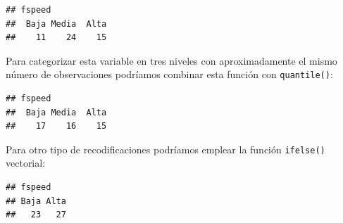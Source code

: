 \documentclass[
]{book}
\newenvironment{Shaded}{\begin{snugshade}}{\end{snugshade}}
\newcommand{\AttributeTok}[1]{\textcolor[rgb]{0.13,0.29,0.53}{#1}}
\newcommand{\DecValTok}[1]{\textcolor[rgb]{0.00,0.00,0.81}{#1}}
\newcommand{\FunctionTok}[1]{\textcolor[rgb]{0.13,0.29,0.53}{\textbf{#1}}}
\newcommand{\NormalTok}[1]{#1}
\newcommand{\OtherTok}[1]{\textcolor[rgb]{0.56,0.35,0.01}{#1}}
\newcommand{\SpecialCharTok}[1]{\textcolor[rgb]{0.81,0.36,0.00}{\textbf{#1}}}
\newcommand{\StringTok}[1]{\textcolor[rgb]{0.31,0.60,0.02}{#1}}
\theoremstyle{break}
\theoremstyle{nonumberplain}
\begin{document}
\begin{verbatim}
## fspeed
##  Baja Media  Alta 
##    11    24    15
\end{verbatim}

Para categorizar esta variable en tres niveles con aproximadamente el mismo número de observaciones podríamos combinar esta función con \texttt{quantile()}:

\begin{Shaded}
\end{Shaded}

\begin{verbatim}
## fspeed
##  Baja Media  Alta 
##    17    16    15
\end{verbatim}

Para otro tipo de recodificaciones podríamos emplear la función \texttt{ifelse()} vectorial:

\begin{Shaded}
\end{Shaded}

\begin{verbatim}
## fspeed
## Baja Alta 
##   23   27
\end{verbatim}
\end{document}
